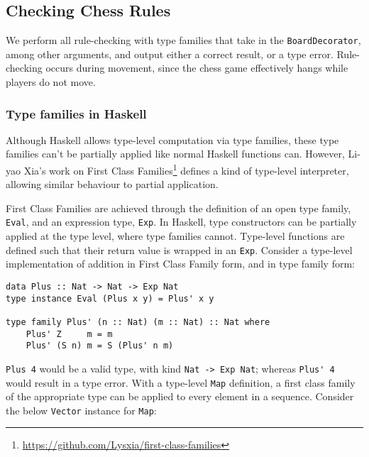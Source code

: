 \documentclass[12pt, a4paper, bibliography=totocnumbered]{scrartcl}
\begin{document}
\subsection{Checking Chess Rules}

We perform all rule-checking with type families that take in the \lstinline[basicstyle=\ttfamily]{BoardDecorator}, among other arguments, and output either a correct result, or a type error. Rule-checking occurs during movement, since the chess game effectively hangs while players do not move.

\subsubsection{Type families in Haskell}

Although Haskell allows type-level computation via type families, these type families can't be partially applied like normal Haskell functions can. However, Li-yao Xia's work on First Class Families\footnote{\url{https://github.com/Lysxia/first-class-families}} defines a kind of type-level interpreter, allowing similar behaviour to partial application.

First Class Families are achieved through the definition of an open type family, \lstinline[basicstyle=\ttfamily]{Eval}, and an expression type, \lstinline[basicstyle=\ttfamily]{Exp}. In Haskell, type constructors can be partially applied at the type level, where type families cannot. Type-level functions are defined such that their return value is wrapped in an \lstinline[basicstyle=\ttfamily]{Exp}. Consider a type-level implementation of addition in First Class Family form, and in type family form:

\begin{lstlisting}
data Plus :: Nat -> Nat -> Exp Nat
type instance Eval (Plus x y) = Plus' x y

type family Plus' (n :: Nat) (m :: Nat) :: Nat where
    Plus' Z     m = m
    Plus' (S n) m = S (Plus' n m)
\end{lstlisting}

\lstinline[basicstyle=\ttfamily]{Plus 4} would be a valid type, with kind \lstinline[basicstyle=\ttfamily]{Nat -> Exp Nat}; whereas \lstinline[basicstyle=\ttfamily]{Plus' 4} would result in a type error. With a type-level \lstinline[basicstyle=\ttfamily]{Map} definition, a first class family of the appropriate type can be applied to every element in a sequence. Consider the below \lstinline[basicstyle=\ttfamily]{Vector} instance for \lstinline[basicstyle=\ttfamily]{Map}:
\end{document}
